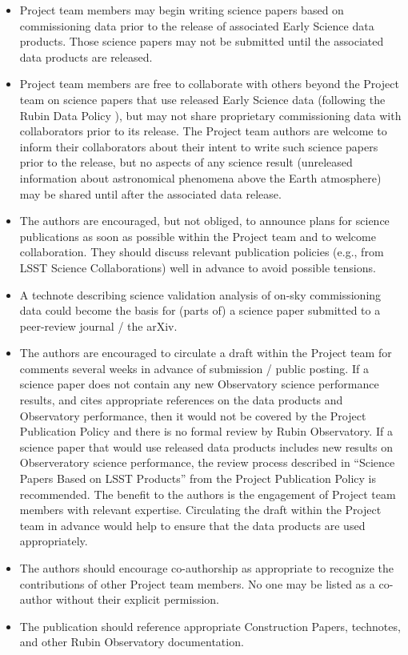 \documentclass[SE,authoryear,toc]{lsstdoc}
\begin{document}
\begin{itemize}

  \item Project team members may begin writing science papers based on commissioning data prior to the release of associated Early Science data products.
  Those science papers may not be submitted until the associated data products are released.

  \item Project team members are free to collaborate with others beyond the Project team on science papers that use released Early Science data (following the Rubin Data Policy ), but may not share proprietary commissioning data with collaborators prior to its release.
  The Project team authors are welcome to inform their collaborators about their intent to write such science papers prior to the release, but no aspects of any science result (unreleased information about astronomical phenomena above the Earth atmosphere) may be shared until after the associated data release.

  \item The authors are encouraged, but not obliged, to announce plans for science publications as soon as possible within the Project team and to welcome collaboration.
  They should discuss relevant publication policies (e.g., from LSST Science Collaborations) well in advance to avoid possible tensions.

  \item A technote describing science validation analysis of on-sky commissioning data could become the basis for (parts of) a science paper submitted to a peer-review journal / the arXiv.

  \item The authors are encouraged to circulate a draft within the Project team for comments several weeks in advance of submission / public posting.
  If a science paper does not contain any new Observatory science performance results, and cites appropriate references on the data products and Observatory performance, then it would not be covered by the Project Publication Policy and there is no formal review by Rubin Observatory.
  If a science paper that would use released data products includes new results on Observeratory science performance, the review process described in ``Science Papers Based on LSST Products'' from the Project Publication Policy  is recommended.
  The benefit to the authors is the engagement of Project team members with relevant expertise.
  Circulating the draft within the Project team in advance would help to ensure that the data products are used appropriately.

  \item The authors should encourage co-authorship as appropriate to recognize the contributions of other Project team members.
  No one may be listed as a co-author without their explicit permission.

  \item The publication should reference appropriate Construction Papers, technotes, and other Rubin Observatory documentation.

\end{itemize}
\end{document}
